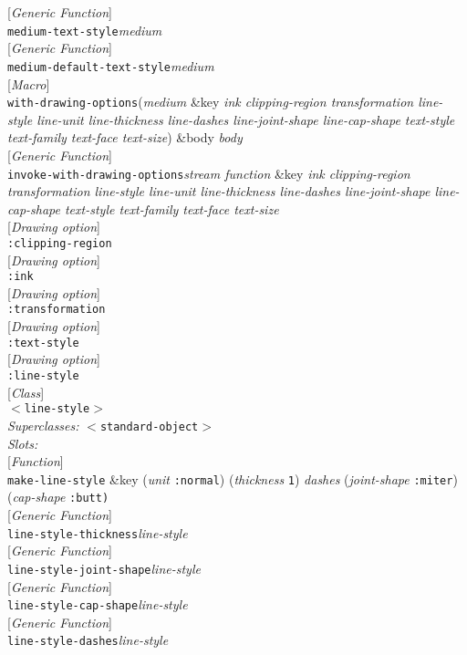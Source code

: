 \documentclass[10pt]{book}
\newenvironment{defother}[2]{[\textit{#1}]\\\texttt{#2}}{\\}
\newenvironment{defun}[1]{\begin{defother}{Function}{#1}}{\end{defother}}
\newenvironment{defgeneric}[1]{\begin{defother}{Generic Function}{#1}}{\end{defother}}
\newenvironment{defmacro}[1]{\begin{defother}{Macro}{#1}}{\end{defother}}
\newenvironment{defclass}[2]{[\textit{Class}]\\\texttt{#1}\\\textit{Superclasses:} \texttt{#2}\\\textit{Slots:}}{\\}
\begin{document}
\begin{defgeneric}{medium-text-style}\textit{medium}\end{defgeneric}
\begin{defgeneric}{medium-default-text-style}\textit{medium}\end{defgeneric}
\begin{defmacro}{with-drawing-options}(\textit{medium} \&key \textit{ink clipping-region transformation line-style line-unit line-thickness line-dashes line-joint-shape line-cap-shape text-style text-family text-face text-size}) \&body \textit{body}\end{defmacro}
\begin{defgeneric}{invoke-with-drawing-options}\textit{stream function} \&key \textit{ink clipping-region transformation line-style line-unit line-thickness line-dashes line-joint-shape line-cap-shape text-style text-family text-face text-size}\end{defgeneric}
\begin{defother}{Drawing option}{:clipping-region}\end{defother}
\begin{defother}{Drawing option}{:ink}\end{defother}
\begin{defother}{Drawing option}{:transformation}\end{defother}
\begin{defother}{Drawing option}{:text-style}\end{defother}
\begin{defother}{Drawing option}{:line-style}\end{defother}
\begin{defclass}{$<$line-style$>$}{$<$standard-object$>$}\end{defclass}
\begin{defun}{make-line-style} \&key (\textit{unit} \texttt{:normal}) (\textit{thickness} \texttt{1}) \textit{dashes} (\textit{joint-shape} \texttt{:miter}) (\textit{cap-shape} \texttt{:butt)}\end{defun}
\begin{defgeneric}{line-style-thickness}\textit{line-style}\end{defgeneric}
\begin{defgeneric}{line-style-joint-shape}\textit{line-style}\end{defgeneric}
\begin{defgeneric}{line-style-cap-shape}\textit{line-style}\end{defgeneric}
\begin{defgeneric}{line-style-dashes}\textit{line-style}\end{defgeneric}
\end{document}

